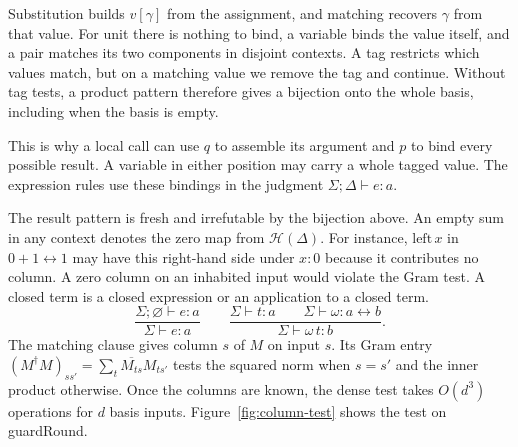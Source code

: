 \documentclass[acmsmall,screen,review,anonymous,nonacm]{acmart}
\newcommand{\C}{\mathbb C}
\newcommand{\storyinlineface}{\small\ttfamily}
\newcommand{\code}[1]{\textnormal{\storyinlineface #1}}
\newcommand{\isorule}[2]{\inferrule{#1}{#2}}
\numberwithin{equation}{section}
\begin{document}
Substitution builds $v[\gamma]$ from the assignment, and matching recovers
$\gamma$ from that value. For unit there is nothing to bind, a variable binds
the value itself, and a pair matches its two components in disjoint contexts.
A tag restricts which values match, but on a matching value we remove the tag
and continue. Without tag tests, a product pattern therefore gives a bijection
onto the whole basis, including when the basis is empty.

This is why a local call can use $q$ to assemble its argument and $p$ to bind
every possible result. A variable in either position may carry a whole tagged
value. The expression rules use these bindings in the judgment
$\Sigma;\Delta\vdash e:a$.
The result pattern is fresh and irrefutable by the bijection above.
An empty sum in any context denotes the zero map from $\mathcal H(\Delta)$.
For instance, $\mathrm{left}\,x$ in $0+1\leftrightarrow1$ may have this
right-hand side under $x:0$ because it contributes no column. A zero column
on an inhabited input would violate the Gram test.
A closed term is a closed expression or an application to a closed term.
\[
 \frac{\Sigma;\varnothing\vdash e:a}{\Sigma\vdash e:a}
 \qquad
 \frac{\Sigma\vdash t:a\qquad\Sigma\vdash\omega:a\leftrightarrow b}
      {\Sigma\vdash\omega\,t:b}.
\]
The matching clause gives column $s$ of $M$ on input $s$. Its Gram entry
$(M^\dagger M)_{ss'}=\sum_t\overline{M_{ts}}M_{ts'}$ tests the squared
norm when $s=s'$ and the inner product otherwise. Once the columns are
known, the dense test takes $O(d^3)$ operations for $d$ basis inputs. Figure~\ref{fig:column-test} shows the test on \code{guardRound}.
\end{document}

